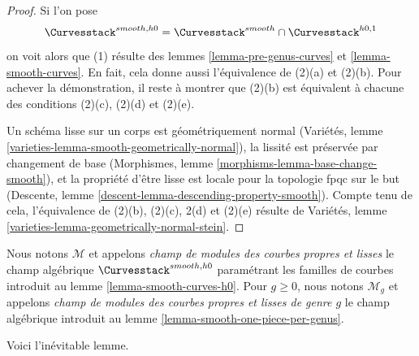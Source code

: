 \begin{proof}
Si l'on pose
$$
\Curvesstack^{smooth, h0} = \Curvesstack^{smooth} \cap
\Curvesstack^{h0, 1}
$$
on voit alors que (1) résulte des
lemmes \ref{lemma-pre-genus-curves} et \ref{lemma-smooth-curves}.
En fait, cela donne aussi l'équivalence de (2)(a) et (2)(b).
Pour achever la démonstration, il reste à montrer que
(2)(b) est équivalent à chacune des conditions (2)(c), (2)(d) et (2)(e).

\medskip\noindent
Un schéma lisse sur un corps est géométriquement normal
(Variétés, lemme \ref{varieties-lemma-smooth-geometrically-normal}),
la lissité est préservée par changement de base
(Morphismes, lemme \ref{morphisms-lemma-base-change-smooth}), et
la propriété d'être lisse est locale pour la topologie fpqc sur le but
(Descente, lemme \ref{descent-lemma-descending-property-smooth}).
Compte tenu de cela, l'équivalence de (2)(b), (2)(c), 2(d) et (2)(e)
résulte de Variétés, lemme \ref{varieties-lemma-geometrically-normal-stein}.
\end{proof}

\begin{definition}
\label{definition-deligne-mumford-smooth}
\begin{reference}
\cite{DM}
\end{reference}
Nous notons $\mathcal{M}$ et appelons
{\it champ de modules des courbes propres et lisses}
le champ algébrique
$\Curvesstack^{smooth, h0}$ paramétrant les familles de courbes
introduit au lemme \ref{lemma-smooth-curves-h0}.
Pour $g \geq 0$, nous notons $\mathcal{M}_g$ et appelons
{\it champ de modules des courbes propres et lisses de genre $g$}
le champ algébrique introduit au
lemme \ref{lemma-smooth-one-piece-per-genus}.
\end{definition}

\noindent
Voici l'inévitable lemme.

